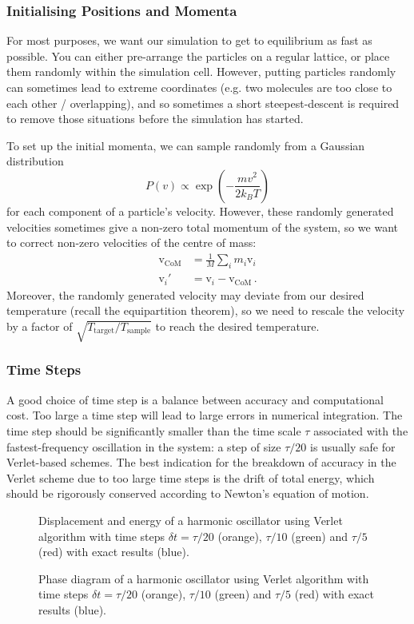 \documentclass{article}
\theoremstyle{plain}\theoremheaderfont{\normalfont\itshape}\theorembodyfont{\rmfamily}\theoremseparator{.}\newtheorem*{rem}{Remark}\newtheorem*{ex}{Example}\newtheorem*{proof}{Proof}\newtheorem*{altp}{Alternative proof}
\theoremstyle{plain}\theoremheaderfont{\normalfont\bfseries}\theorembodyfont{\rmfamily}\theoremseparator{.}\newtheorem{thm}{Theorem}[section]\newtheorem{lem}[thm]{Lemma}\newtheorem{prop}[thm]{Proposition}\newtheorem*{cor}{Corollary}\newtheorem{defn}[thm]{Definition}\newtheorem{clm}[thm]{Claim}\newtheorem{clminproof}{Claim}\newtheorem{alg}[thm]{Algorithm}\newtheorem{hyp}[thm]{Hypothesis}\newtheorem{law}[thm]{Law}
\theoremstyle{break}\theoremheaderfont{\normalfont\itshape}\theorembodyfont{\rmfamily}\theoremseparator{.\medskip}\newtheorem*{proofskip}{Proof}\newtheorem*{exs}{Examples}\newtheorem*{rems}{Remarks}
\theoremstyle{break}\theoremheaderfont{\normalfont\bfseries}\theorembodyfont{\rmfamily}\theoremseparator{.\medskip}\newtheorem{lemskip}[thm]{Lemma}\newtheorem{defnskip}[thm]{Definition}\newtheorem{propskip}[thm]{Proposition}\newtheorem{thmskip}[thm]{Theorem}
\numberwithin{equation}{section}
\newcommand{\vb}[1]{\bm{\mathrm{#1}}}
\begin{document}
    \subsubsection{Initialising Positions and Momenta}
    For most purposes, we want our simulation to get to equilibrium as fast as possible. You can either pre-arrange the particles on a regular lattice, or place them randomly within the simulation cell. However, putting particles randomly can sometimes lead to extreme coordinates (e.g. two molecules are too close to each other / overlapping), and so sometimes a short steepest-descent is required to remove those situations before the simulation has started.

    To set up the initial momenta, we can sample randomly from a Gaussian distribution
    \begin{equation}
        P(v)\propto \exp\left(-\frac{mv^2}{2k_B T}\right)
    \end{equation}
    for each component of a particle's velocity. However, these randomly generated velocities sometimes give a non-zero total momentum of the system, so we want to correct non-zero velocities of the centre of mass:
    \begin{align}
        \vb{v}_{\text{CoM}}&=\frac{1}{M}\sum_i m_i\vb{v}_i \\
        \vb{v}_i'&=\vb{v}_i-\vb{v}_{\text{CoM}}\,.
    \end{align}
    Moreover, the randomly generated velocity may deviate from our desired temperature (recall the equipartition theorem), so we need to rescale the velocity by a factor of \(\sqrt{T_{\text{target}}/T_{\text{sample}}}\) to reach the desired temperature.

    \subsubsection{Time Steps}
    A good choice of time step is a balance between accuracy and computational cost. Too large a time step will lead to large errors in numerical integration. The time step should be significantly smaller than the time scale \(\tau\) associated with the fastest-frequency oscillation in the system: a step of size \(\tau/20\) is usually safe for Verlet-based schemes. The best indication for the breakdown of accuracy in the Verlet scheme due to too large time steps is the drift of total energy, which should be rigorously conserved according to Newton's equation of motion.

    \begin{figure}
        \centering
        
        \caption{Displacement and energy of a harmonic oscillator using Verlet algorithm with time steps \(\delta t=\tau/20\) (orange), \(\tau/10\) (green) and \(\tau/5\) (red) with exact results (blue).}
    \end{figure}
    \begin{figure}
        \centering
        
        \caption{Phase diagram of a harmonic oscillator using Verlet algorithm with time steps \(\delta t=\tau/20\) (orange), \(\tau/10\) (green) and \(\tau/5\) (red) with exact results (blue).}
    \end{figure}
\end{document}
